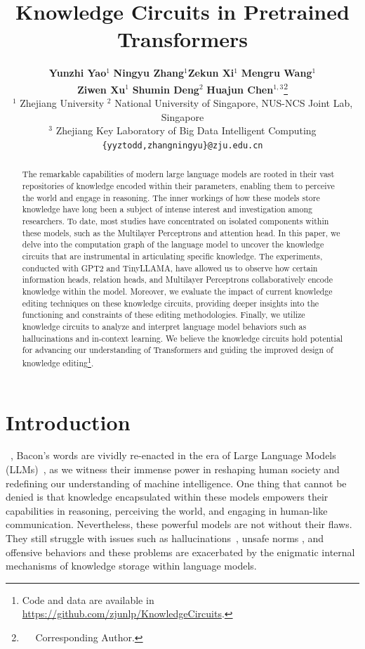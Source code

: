 \documentclass{article}
\title{Knowledge Circuits in Pretrained Transformers}
\author{
    \textbf{Yunzhi Yao}$^1$ \quad \textbf{Ningyu Zhang}$^1$\footnotemark[1] \quad \textbf{Zekun Xi}$^1$ \quad \textbf{Mengru Wang}$^1$ \\ \textbf{Ziwen Xu}$^1$ \quad
    \textbf{Shumin Deng}$^{2}$ \quad \textbf{Huajun Chen}$^{1,3}$\thanks{$\quad$ Corresponding Author.} 
  \\ 
  $^1$ Zhejiang University \quad $^2$ National University of Singapore, NUS-NCS Joint Lab, Singapore  \quad \\$^3$ Zhejiang Key Laboratory of Big Data Intelligent Computing\\
  \texttt{\{yyztodd,zhangningyu\}@zju.edu.cn} \\ 
}
\begin{document}
\maketitle
\begin{abstract}
\setcounter{footnote}{0}
The remarkable capabilities of modern large language models are rooted in their vast repositories of knowledge encoded within their parameters, enabling them to perceive the world and engage in reasoning. The inner workings of how these models store knowledge have long been a subject of intense interest and investigation among researchers. To date, most studies have concentrated on isolated components within these models, such as the Multilayer Perceptrons and attention head. In this paper, we delve into the computation graph of the language model to uncover the knowledge circuits that are instrumental in articulating specific knowledge. The experiments, conducted with GPT2 and TinyLLAMA, have allowed us to observe how certain information heads, relation heads, and Multilayer Perceptrons collaboratively encode knowledge within the model. Moreover, we evaluate the impact of current knowledge editing techniques on these knowledge circuits, providing deeper insights into the functioning and constraints of these editing methodologies. Finally, we utilize knowledge circuits to analyze and interpret language model behaviors such as hallucinations and in-context learning. We believe the knowledge circuits hold potential for advancing our understanding of Transformers and guiding the improved design of knowledge editing\footnote{Code and data are available in \url{https://github.com/zjunlp/KnowledgeCircuits}.}.

\end{abstract}

\section{Introduction}
\label{sec:intro}

~\cite{bacon,bacon1949advancement},
Bacon's words are vividly re-enacted in the era of Large Language Models (LLMs)~\cite{gpt4,DBLP:journals/corr/abs-2303-18223}, as we witness their immense power in reshaping human society and redefining our understanding of machine intelligence. 
One thing that cannot be denied is that knowledge encapsulated within these models empowers their capabilities in reasoning, perceiving the world, and engaging in human-like communication. 
Nevertheless, these powerful models are not without their flaws. 
They still struggle with issues such as hallucinations~\cite{huang2023survey,wang2023survey,DBLP:journals/corr/abs-2402-03190}, unsafe norms \cite{bonaldi2024nlp,DBLP:journals/corr/abs-2401-05561}, and offensive behaviors \cite{DBLP:journals/corr/abs-2309-07045,jiang2024crosslingual} and these problems are exacerbated by the enigmatic internal mechanisms of knowledge storage within language models.
\end{document}
